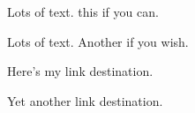 \documentclass[twoside,a5paper]{book}
\begin{document}
Lots of text.  this if you can.

Lots of text. Another  if you wish.
\newpage

\hypertarget{test}{Here's my link destination.}

\hypertarget{testB}{Yet another link destination.}
\end{document}
